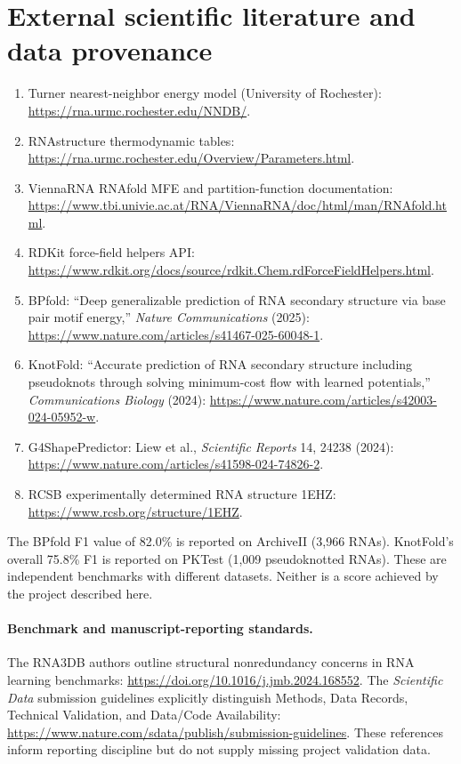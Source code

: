 \documentclass[11pt,a4paper]{article}
\begin{document}
\section{External scientific literature and data provenance}
\begin{enumerate}[leftmargin=*]
\item Turner nearest-neighbor energy model (University of Rochester): \url{https://rna.urmc.rochester.edu/NNDB/}.
\item RNAstructure thermodynamic tables: \url{https://rna.urmc.rochester.edu/Overview/Parameters.html}.
\item ViennaRNA RNAfold MFE and partition-function documentation: \url{https://www.tbi.univie.ac.at/RNA/ViennaRNA/doc/html/man/RNAfold.html}.
\item RDKit force-field helpers API: \url{https://www.rdkit.org/docs/source/rdkit.Chem.rdForceFieldHelpers.html}.
\item BPfold: ``Deep generalizable prediction of RNA secondary structure via base pair motif energy,'' \emph{Nature Communications} (2025): \url{https://www.nature.com/articles/s41467-025-60048-1}.
\item KnotFold: ``Accurate prediction of RNA secondary structure including pseudoknots through solving minimum-cost flow with learned potentials,'' \emph{Communications Biology} (2024): \url{https://www.nature.com/articles/s42003-024-05952-w}.
\item G4ShapePredictor: Liew et al., \emph{Scientific Reports} 14, 24238 (2024): \url{https://www.nature.com/articles/s41598-024-74826-2}.
\item RCSB experimentally determined RNA structure 1EHZ: \url{https://www.rcsb.org/structure/1EHZ}.
\end{enumerate}
The BPfold F1 value of 82.0\% is reported on ArchiveII (3,966 RNAs). KnotFold's overall 75.8\% F1 is reported on PKTest (1,009 pseudoknotted RNAs). These are independent benchmarks with different datasets. Neither is a score achieved by the project described here.

\paragraph{Benchmark and manuscript-reporting standards.}
The RNA3DB authors outline structural nonredundancy concerns in RNA learning benchmarks: \url{https://doi.org/10.1016/j.jmb.2024.168552}. The \emph{Scientific Data} submission guidelines explicitly distinguish Methods, Data Records, Technical Validation, and Data/Code Availability: \url{https://www.nature.com/sdata/publish/submission-guidelines}. These references inform reporting discipline but do not supply missing project validation data.
\end{document}
